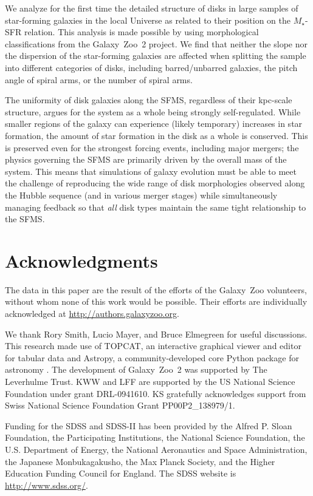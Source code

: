 \documentclass[useAMS,usenatbib]{mn2e}
\def\rr{\color{titlecol}}
\begin{document}
We analyze for the first time the detailed structure of disks in large samples of star-forming galaxies {\rr in the local Universe }as related to their position on the $M_\star$-SFR relation. This analysis is made possible by using morphological classifications from the Galaxy~Zoo~2 project. We find that neither the slope nor the dispersion of the star-forming galaxies are affected when splitting the sample into different categories of disks, including barred/unbarred galaxies, the pitch angle of spiral arms, or the number of spiral arms. 

The uniformity of disk galaxies along the SFMS, regardless of their kpc-scale structure, argues for the system as a whole being strongly self-regulated. While smaller regions of the galaxy can experience (likely temporary) increases in star formation, the amount of star formation in the disk as a whole is conserved. This is preserved even for the strongest forcing events, including major mergers; the physics governing the SFMS are primarily driven by the overall mass of the system. This means that simulations of galaxy evolution must be able to meet the challenge of reproducing the wide range of disk morphologies observed along the Hubble sequence (and in various merger stages) while simultaneously managing feedback so that \emph{all} disk types maintain the same tight relationship to the SFMS.


\section*{Acknowledgments}

The data in this paper are the result of the efforts of the Galaxy~Zoo volunteers, without whom none of this work would be possible. Their efforts are individually acknowledged at \url{http://authors.galaxyzoo.org}. 

We thank Rory Smith, Lucio Mayer, and Bruce Elmegreen for useful discussions. This research made use of TOPCAT, an interactive graphical viewer and editor for tabular data \citep{tay05} and Astropy, a community-developed core Python package for astronomy \citep{ast13}. The development of Galaxy~Zoo~2 was supported by The Leverhulme Trust. KWW and LFF are supported by the US National Science Foundation under grant DRL-0941610. KS gratefully acknowledges support from Swiss National Science Foundation Grant PP00P2\_138979/1.

Funding for the SDSS and SDSS-II has been provided by the Alfred P. Sloan Foundation, the Participating Institutions, the National Science Foundation, the U.S. Department of Energy, the National Aeronautics and Space Administration, the Japanese Monbukagakusho, the Max Planck Society, and the Higher Education Funding Council for England. The SDSS website is \url{http://www.sdss.org/}.
\end{document}
